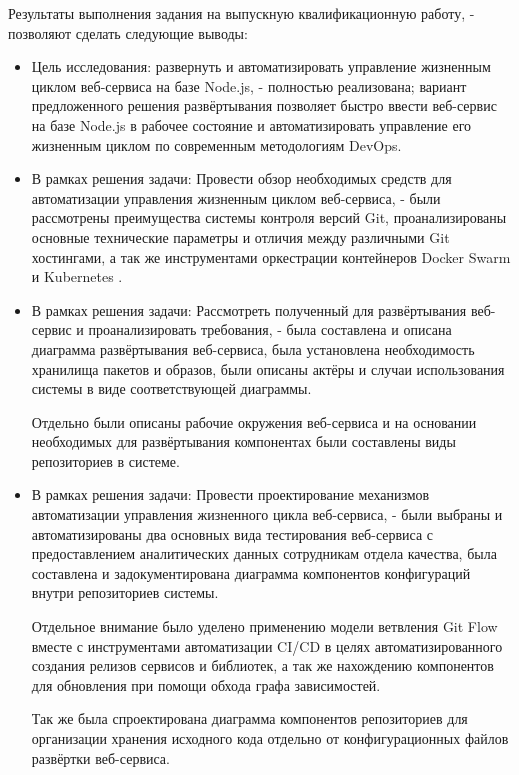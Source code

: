 \Conclusion %

Результаты выполнения задания на выпускную квалификационную работу, - позволяют сделать следующие выводы:
\begin{itemize}
    \item
    Цель исследования: развернуть и автоматизировать управление жизненным циклом веб-сервиса на базе Node.js, - полностью реализована;
    вариант предложенного решения развёртывания позволяет быстро ввести веб-сервис на базе Node.js в рабочее состояние и автоматизировать управление его жизненным циклом по современным методологиям DevOps.

    \item
    В рамках решения задачи: Провести обзор необходимых средств для автоматизации управления жизненным циклом веб-сервиса,
    - были рассмотрены преимущества системы контроля версий Git, проанализированы основные технические параметры и отличия между различными Git хостингами, а так же инструментами оркестрации контейнеров Docker Swarm и Kubernetes .

    \item
    В рамках решения задачи: Рассмотреть полученный для развёртывания веб-сервис и проанализировать требования,
    - была составлена и описана диаграмма развёртывания веб-сервиса, была установлена необходимость хранилища пакетов и образов, были описаны актёры и случаи использования системы в виде соответствующей диаграммы.

    Отдельно были описаны рабочие окружения веб-сервиса и на основании необходимых для развёртывания компонентах были составлены виды репозиториев в системе.

    \item
    В рамках решения задачи: Провести проектирование механизмов автоматизации управления жизненного цикла веб-сервиса,
    - были выбраны и автоматизированы два основных вида тестирования веб-сервиса с предоставлением аналитических данных сотрудникам отдела качества,
    была составлена и задокументирована диаграмма компонентов конфигураций внутри репозиториев системы.

    Отдельное внимание было уделено применению модели ветвления Git Flow вместе с инструментами автоматизации CI/CD в целях автоматизированного создания релизов сервисов и библиотек,
    а так же нахождению компонентов для обновления при помощи обхода графа зависимостей.

    Так же была спроектирована диаграмма компонентов репозиториев для организации хранения исходного кода отдельно от конфигурационных файлов развёртки веб-сервиса.


\end{itemize}
